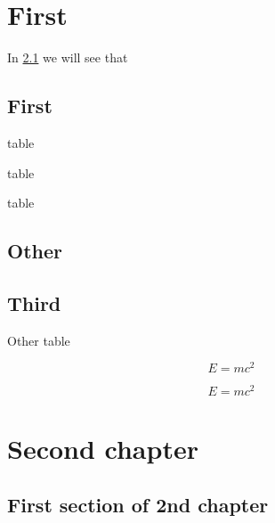 \documentclass{book}
\newcounter{othersections}
\begin{document}
\chapter{First}

In \cref{section::dummylabel} we will see that

\section{First}

\begin{table}
\caption{table}
\end{table}


\begin{table}
\caption{table}
\end{table}


\begin{table}
\caption{table}
\end{table}



\section{Other}
\section{Third}

\begin{table}
\caption{Other table}
\end{table}

\begin{equation}
  E=mc^2
\end{equation}

\begin{equation}
  E=mc^2
\end{equation}



\chapter{Second chapter}

\section{First section of 2nd chapter} \label{section::dummylabel}

\thesection\ \ \theothersections\ \fbox{\color{blue}{\thetotaltables}}
\end{document}
